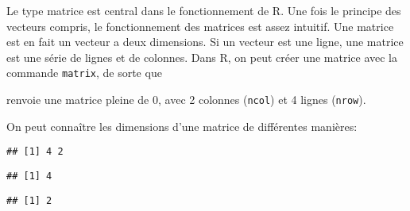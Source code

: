 Le type matrice est central dans le fonctionnement de R.
Une fois le principe des vecteurs compris, le fonctionnement des matrices est assez intuitif.
Une matrice est en fait un vecteur a deux dimensions.
Si un vecteur est une ligne, une matrice est une série de lignes et de colonnes.
Dans R, on peut créer une matrice avec la commande \texttt{matrix}, de sorte que

\begin{knitrout}
\color{fgcolor}\begin{kframe}
\begin{flushleft}
\ttfamily\noindent
{}\hlassignement{\usebox{\hlnormalsizeboxlessthan}-}{\ }\hlkeyword{(}\hlkeyword{,}{\ }\hlargument{=}{\ }\hlkeyword{,}{\ }\hlargument{=}{\ }\hlkeyword{)}\mbox{}
\normalfont
\end{flushleft}
\end{kframe}
\end{knitrout}


\noindent renvoie une matrice pleine de 0, avec 2 colonnes (\texttt{ncol}) et 4 lignes (\texttt{nrow}).

On peut connaître les dimensions d'une matrice de différentes manières:
\begin{knitrout}
\color{fgcolor}\begin{kframe}
\begin{flushleft}
\ttfamily\noindent
{}\hlkeyword{(}\hlkeyword{)}\mbox{}
\normalfont
\end{flushleft}
\begin{verbatim}
## [1] 4 2
\end{verbatim}
\begin{flushleft}
\ttfamily\noindent
{}\hlkeyword{(}\hlkeyword{)}\mbox{}
\normalfont
\end{flushleft}
\begin{verbatim}
## [1] 4
\end{verbatim}
\begin{flushleft}
\ttfamily\noindent
{}\hlkeyword{(}\hlkeyword{)}\mbox{}
\normalfont
\end{flushleft}
\begin{verbatim}
## [1] 2
\end{verbatim}
\end{kframe}
\end{knitrout}


